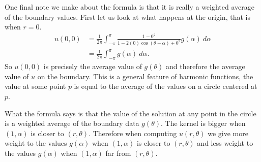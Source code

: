 \documentclass{ximera}
\begin{document}
One final note we make about the formula is that it is really a weighted average of the boundary values. First let us look at what happens at the origin, that is when $r=0$. %
\begin{equation*}
    \begin{split}
        u(0,0) &= \frac{1}{2\pi} \int_{-\pi}^{\pi} \frac{1 -0^2}{1 - 2(0)\cos(\theta-\alpha) +0^2} g(\alpha) ~ d\alpha\\
        & = \frac{1}{2\pi} \int_{-\pi}^{\pi} g(\alpha) ~ d\alpha .
    \end{split}
\end{equation*}
So $u(0,0)$ is precisely the average value of $g(\theta)$ and therefore the average value of $u$ on the boundary.  This is a general feature of harmonic functions, the value at some point $p$ is equal to the average of the values on a circle centered at $p$. 

What the formula says is that the value of the solution at any point in the circle is a weighted average of the boundary data $g(\theta)$.  The kernel is bigger when $(1,\alpha)$ is closer to $(r,\theta)$.  Therefore when computing $u(r,\theta)$ we give more weight to the values $g(\alpha)$ when $(1,\alpha)$ is closer to $(r,\theta)$ and less weight to the values $g(\alpha)$ when $(1,\alpha)$ far from $(r,\theta)$.
\end{document}
